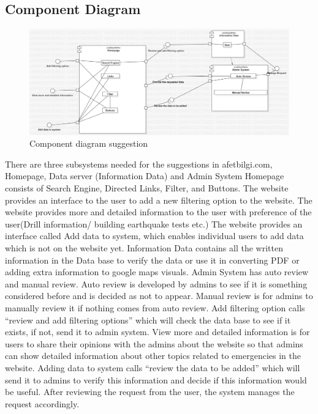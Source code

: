 \documentclass[12pt]{report}
\begin{document}
\subsection{Component Diagram}
\begin{figure}[H]
    \includegraphics[scale=0.4]{component2.jpg}
    \centering
    \caption{Component diagram suggestion}
\end{figure}

There are three subsystems needed for the suggestions in afetbilgi.com, Homepage, Data server (Information Data) and Admin System	
Homepage consists of Search Engine, Directed Links, Filter, and Buttons.
The website provides an interface to the user to add a new filtering option to the website.
The website provides more and detailed information to the user with preference of the user(Drill information/ building earthquake tests etc.)
The website provides an interface called Add data to system, which enables individual users to add data which is not on the website yet.
Information Data contains all the written information in the Data base to verify the data or use it in converting PDF or adding extra information to google maps visuals.
Admin System has auto review and manual review.
Auto review is developed by admins to see if it is something considered before and is decided as not to appear. 
Manual review is for admins to manually review it if nothing comes from auto review.
Add filtering option calls “review and add filtering options” which will check the data base to see if it exists, if not, send it to admin system.
View more and detailed information is for users to share their opinions with the admins about the website so that admins can show detailed information about other topics related to emergencies in the website.
Adding data to system calls “review the data to be added” which will send it to admins to verify this information and decide if this information would be useful.
After reviewing the request from the user, the system manages the request accordingly.
\end{document}
